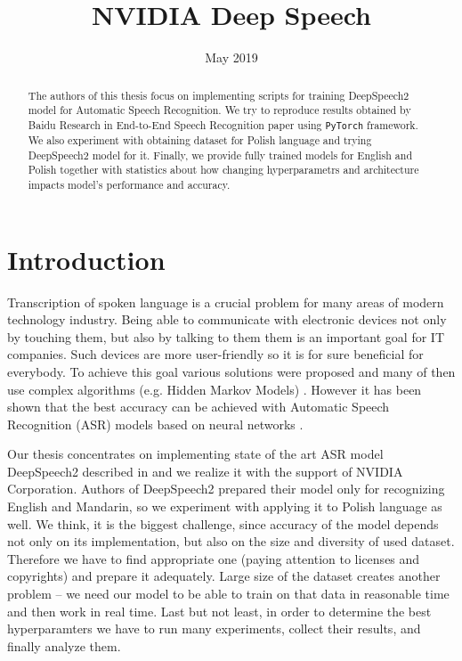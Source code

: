 \documentclass[licencjacka,en]{pracamgr}
\title{NVIDIA Deep Speech}
\date{May 2019}
\begin{document}
\maketitle

\begin{abstract}
  The authors of this thesis focus on implementing scripts for training DeepSpeech2 model for Automatic Speech Recognition. We try to reproduce results obtained by Baidu Research in End-to-End Speech Recognition paper \cite{DS2} using \texttt{PyTorch} framework. We also experiment with obtaining dataset for Polish language and trying DeepSpeech2 model for it. Finally, we provide fully trained models for English and Polish together with statistics about how changing hyperparametrs and architecture impacts model's performance and accuracy.
\end{abstract}

\tableofcontents

\chapter*{Introduction}
Transcription of spoken language is a crucial problem for many areas of modern technology industry. Being able to communicate with electronic devices not only by touching them, but also by talking to them them is an important goal for IT companies. Such devices are more user-friendly so it is for sure beneficial for everybody. To achieve this goal various solutions were proposed and many of then use complex algorithms (e.g. Hidden Markov Models) \cite{DS1}. However it has been shown that the best accuracy can be achieved with Automatic Speech Recognition (ASR) models based on neural networks \cite{DS2}.

Our thesis concentrates on implementing state of the art ASR model DeepSpeech2 described in \cite{DS2} and we realize it with the support of NVIDIA Corporation. Authors of DeepSpeech2 prepared their model only for recognizing English and Mandarin, so we experiment with applying it to Polish language as well. We think, it is the biggest challenge, since accuracy of the model depends not only on its implementation, but also on the size and diversity of used dataset. Therefore we have to find appropriate one (paying attention to licenses and copyrights) and prepare it adequately. Large size of the dataset creates another problem -- we need our model to be able to train on that data in reasonable time and then work in real time. Last but not least, in order to determine the best hyperparamters we have to run many experiments, collect their results, and finally analyze them.
\end{document}
